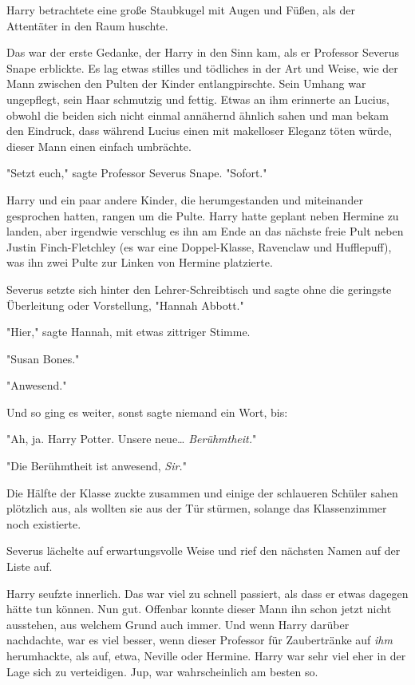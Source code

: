{Harry betrachtete eine große Staubkugel mit Augen und Füßen, als der Attentäter in den Raum huschte.

Das war der erste Gedanke, der Harry in den Sinn kam, als er Professor Severus Snape erblickte. Es lag etwas stilles und tödliches in der Art und Weise, wie der Mann zwischen den Pulten der Kinder entlangpirschte. Sein Umhang war ungepflegt, sein Haar schmutzig und fettig. Etwas an ihm erinnerte an Lucius, obwohl die beiden sich nicht einmal annähernd ähnlich sahen und man bekam den Eindruck, dass während Lucius einen mit makelloser Eleganz töten würde, dieser Mann einen einfach umbrächte.

"Setzt euch," sagte Professor Severus Snape. "Sofort."

Harry und ein paar andere Kinder, die herumgestanden und miteinander gesprochen hatten, rangen um die Pulte. Harry hatte geplant neben Hermine zu landen, aber irgendwie verschlug es ihn am Ende an das nächste freie Pult neben Justin Finch-Fletchley (es war eine Doppel-Klasse, Ravenclaw und Hufflepuff), was ihn zwei Pulte zur Linken von Hermine platzierte.

Severus setzte sich hinter den Lehrer-Schreibtisch und sagte ohne die geringste Überleitung oder Vorstellung, "Hannah Abbott."

"Hier," sagte Hannah, mit etwas zittriger Stimme.

"Susan Bones."

"Anwesend."

Und so ging es weiter, sonst sagte niemand ein Wort, bis:

"Ah, ja. Harry Potter. Unsere neue… \emph{Berühmtheit.}"

"Die Berühmtheit ist anwesend, \emph{Sir.}"

Die Hälfte der Klasse zuckte zusammen und einige der schlaueren Schüler sahen plötzlich aus, als wollten sie aus der Tür stürmen, solange das Klassenzimmer noch existierte.

Severus lächelte auf erwartungsvolle Weise und rief den nächsten Namen auf der Liste auf.

Harry seufzte innerlich. Das war viel zu schnell passiert, als dass er etwas dagegen hätte tun können. Nun gut. Offenbar konnte dieser Mann ihn schon jetzt nicht ausstehen, aus welchem Grund auch immer. Und wenn Harry darüber nachdachte, war es viel besser, wenn dieser Professor für Zaubertränke auf \emph{ihm} herumhackte, als auf, etwa, Neville oder Hermine. Harry war sehr viel eher in der Lage sich zu verteidigen. Jup, war wahrscheinlich am besten so.

}
